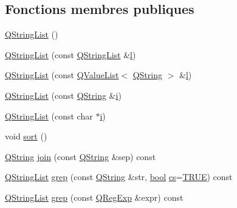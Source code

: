 \subsection*{Fonctions membres publiques}
\begin{DoxyCompactItemize}
\item 
\hyperlink{class_q_string_list_a3e6ca70816297d8ad4b7baa749a0b8e2}{Q\+String\+List} ()
\item 
\hyperlink{class_q_string_list_a81b4d15aba319a62202e2b5c53212c5d}{Q\+String\+List} (const \hyperlink{class_q_string_list}{Q\+String\+List} \&\hyperlink{060__command__switch_8tcl_aff56f84b49947b84b2a304f51cf8e678}{l})
\item 
\hyperlink{class_q_string_list_ab94a73fead9d31d023d4fc0816542f33}{Q\+String\+List} (const \hyperlink{class_q_value_list}{Q\+Value\+List}$<$ \hyperlink{class_q_string}{Q\+String} $>$ \&\hyperlink{060__command__switch_8tcl_aff56f84b49947b84b2a304f51cf8e678}{l})
\item 
\hyperlink{class_q_string_list_ae2fcb3e62bfc329f6f4609cb387cb52d}{Q\+String\+List} (const \hyperlink{class_q_string}{Q\+String} \&\hyperlink{060__command__switch_8tcl_a8c90afd4641b25be86bd09983c3cbee0}{i})
\item 
\hyperlink{class_q_string_list_acc4b2b8e5b8b04da731af0657491c963}{Q\+String\+List} (const char $\ast$\hyperlink{060__command__switch_8tcl_a8c90afd4641b25be86bd09983c3cbee0}{i})
\item 
void \hyperlink{class_q_string_list_a1b3bf672d6dd980fb487e9392fdd9bd6}{sort} ()
\item 
\hyperlink{class_q_string}{Q\+String} \hyperlink{class_q_string_list_a302a422f6f4060eb02d4793d3788e4cc}{join} (const \hyperlink{class_q_string}{Q\+String} \&sep) const 
\item 
\hyperlink{class_q_string_list}{Q\+String\+List} \hyperlink{class_q_string_list_a7e9abb1e84c5c8c164f4741f7de1bd9a}{grep} (const \hyperlink{class_q_string}{Q\+String} \&str, \hyperlink{qglobal_8h_a1062901a7428fdd9c7f180f5e01ea056}{bool} \hyperlink{qtextcodec_8cpp_a067a00d3965ca879847daf3c8c224ee6}{cs}=\hyperlink{qglobal_8h_a04a6422a52070f0dc478693da640242b}{T\+R\+U\+E}) const 
\item 
\hyperlink{class_q_string_list}{Q\+String\+List} \hyperlink{class_q_string_list_ad5238a65b8315588001c549586d1ba34}{grep} (const \hyperlink{class_q_reg_exp}{Q\+Reg\+Exp} \&expr) const 
\end{DoxyCompactItemize}
